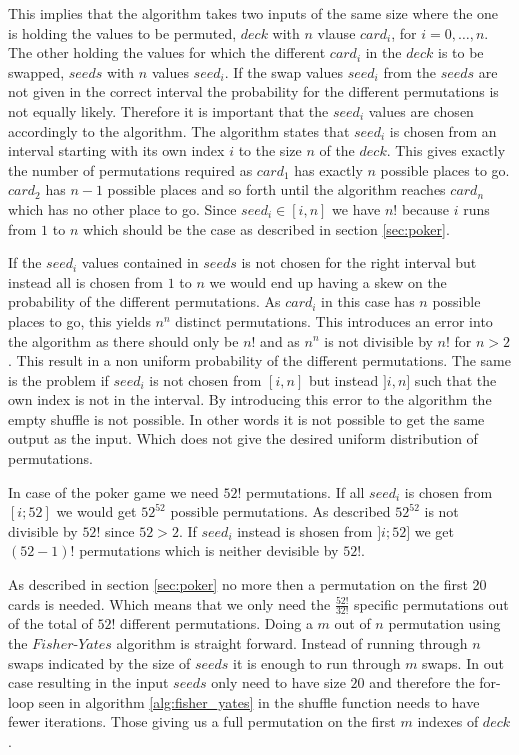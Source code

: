 \documentclass[twoside,11pt,openright]{report}
\begin{document}
This implies that the algorithm takes two inputs of the same size where the one is holding the values to be permuted, $deck$ with $n$ vlause $card_i$, for $i=0,\dots,n$. The other holding the values for which the different $card_i$ in the $deck$ is to be swapped, $seeds$ with $n$ values $seed_i$. If the swap values $seed_i$ from the $seeds$ are not given in the correct interval the probability for the different permutations is not equally likely. Therefore it is important that the $seed_i$ values are chosen accordingly to the algorithm. The algorithm states that $seed_i$ is chosen from an interval starting with its own index $i$ to the size $n$ of the $deck$. This gives exactly the number of permutations required as $card_1$ has exactly $n$ possible places to go. $card_2$ has $n-1$ possible places and so forth until the algorithm reaches $card_n$ which has no other place to go. Since $seed_i\in[i,n]$ we have $n!$ because $i$ runs from $1$ to $n$ which should be the case as described in section \ref{sec:poker}.

If the $seed_i$ values contained in $seeds$ is not chosen for the right interval but instead all is chosen from $1$ to $n$ we would end up having a skew on the probability of the different permutations. As $card_i$ in this case has $n$ possible places to go, this yields $n^n$ distinct permutations. This introduces an error into the algorithm as there should only be $n!$ and as $n^n$ is not divisible by $n!$ for $n>2$. This result in a non uniform probability of the different permutations. The same is the problem if $seed_i$ is not chosen from $[i,n]$ but instead $]i,n]$ such that the own index is not in the interval. By introducing this error to the algorithm the empty shuffle is not possible. In other words it is not possible to get the same output as the input. Which does not give the desired uniform distribution of permutations.

\bigskip

In case of the poker game we need $52!$ permutations. If all $seed_i$ is chosen from $[i;52]$ we would get $52^{52}$ possible permutations. As described $52^{52}$ is not divisible by $52!$ since $52>2$. If $seed_i$ instead is shosen from $]i;52]$ we get $(52-1)!$ permutations which is neither devisible by $52!$.

\bigskip

As described in section \ref{sec:poker} no more then a permutation on the first 20 cards is needed. Which means that we only need the $\frac{52!}{32!}$ specific permutations out of the total of $52!$ different permutations. Doing a $m$ out of $n$ permutation using the $Fisher\text{-}Yates$ algorithm is straight forward. Instead of running through $n$ swaps indicated by the size of $seeds$ it is enough to run through $m$ swaps. In out case resulting in the input $seeds$ only need to have size $20$ and therefore the for-loop seen in algorithm \ref{alg:fisher_yates} in the shuffle function needs to have fewer iterations. Those giving us a full permutation on the first $m$ indexes of $deck$.
\end{document}
